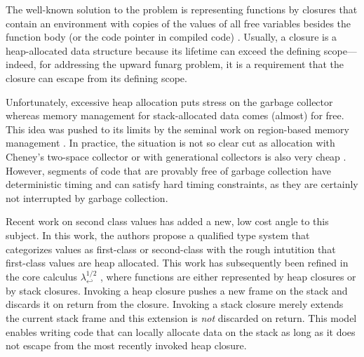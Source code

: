 \documentclass[sigplan,dvipsnames,screen]{acmart}
\newcommand{\LamWhatif}{\ensuremath{\lambda^{1/2}_{\hookleftarrow}}}
\begin{document}
The well-known solution to the problem is representing functions by
closures that contain an environment with copies of the values of all
free variables besides the function body (or the code pointer in
compiled code) \cite{landin66,DBLP:conf/acm/Reynolds72}.
Usually, a closure is a heap-allocated data structure because its
lifetime can exceed the defining scope---indeed, for addressing the
upward funarg problem, it is a requirement that the closure can escape
from its defining scope.

Unfortunately, excessive heap allocation puts stress on the garbage
collector whereas memory management for stack-allocated data comes
(almost) for free. This idea was pushed to its limits by the seminal work on
region-based memory management
\cite{DBLP:conf/popl/TofteT94,DBLP:journals/iandc/TofteT97}. In
practice, the situation is not so clear cut as allocation with
Cheney's two-space collector or with generational collectors is also
very cheap \cite{DBLP:journals/jfp/AppelS96}. However, segments of code that are provably free of
garbage collection have deterministic timing and can satisfy hard
timing constraints, as they are certainly not interrupted by garbage
collection. 

Recent work on second class values
\cite{DBLP:conf/oopsla/OsvaldEWAR16} has
added a new, low cost angle to this subject. In this work, the authors
propose a qualified type system that categorizes values as first-class
or second-class with the rough intutition that first-class values are
heap allocated. This work has subsequently been refined in the core
calculus $\LamWhatif$
\cite{DBLP:conf/ecoop/XhebrajB0R22}, where functions are
either represented by heap closures or by stack closures. Invoking a
heap closure pushes a new frame on the stack and discards it on return from the
closure. Invoking a stack closure merely extends the current stack
frame and this extension is \emph{not} discarded on return.
This model enables writing code that can locally allocate data on the
stack as long as it does not escape from the most recently invoked
heap closure.
\end{document}
